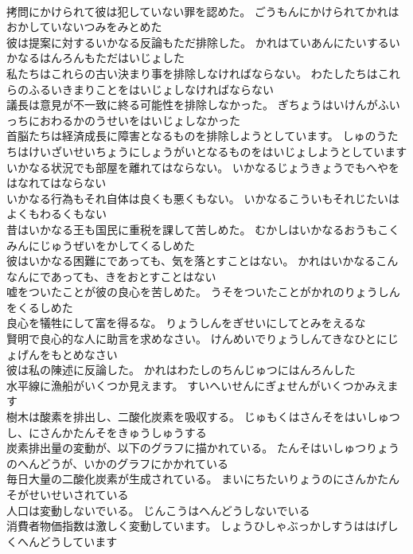 \documentclass[8pt]{extreport}
\begin{document}
\begin{CJK}{UTF8}{min}
\\	拷問にかけられて彼は犯していない罪を認めた。	ごうもんにかけられてかれはおかしていないつみをみとめた 
\\	彼は提案に対するいかなる反論もただ排除した。	かれはていあんにたいするいかなるはんろんもただはいじょした 
\\	私たちはこれらの古い決まり事を排除しなければならない。	わたしたちはこれらのふるいきまりことをはいじょしなければならない 
\\	議長は意見が不一致に終る可能性を排除しなかった。	ぎちょうはいけんがふいっちにおわるかのうせいをはいじょしなかった 
\\	首脳たちは経済成長に障害となるものを排除しようとしています。	しゅのうたちはけいざいせいちょうにしょうがいとなるものをはいじょしようとしています 
\\	いかなる状況でも部屋を離れてはならない。	いかなるじょうきょうでもへやをはなれてはならない 
\\	いかなる行為もそれ自体は良くも悪くもない。	いかなるこういもそれじたいはよくもわるくもない 
\\	昔はいかなる王も国民に重税を課して苦しめた。	むかしはいかなるおうもこくみんにじゅうぜいをかしてくるしめた 
\\	彼はいかなる困難にであっても、気を落とすことはない。	かれはいかなるこんなんにであっても、きをおとすことはない 
\\	嘘をついたことが彼の良心を苦しめた。	うそをついたことがかれのりょうしんをくるしめた 
\\	良心を犠牲にして富を得るな。	りょうしんをぎせいにしてとみをえるな 
\\	賢明で良心的な人に助言を求めなさい。	けんめいでりょうしんてきなひとにじょげんをもとめなさい 
\\	彼は私の陳述に反論した。	かれはわたしのちんじゅつにはんろんした 
\\	水平線に漁船がいくつか見えます。	すいへいせんにぎょせんがいくつかみえます 
\\	樹木は酸素を排出し、二酸化炭素を吸収する。	じゅもくはさんそをはいしゅつし、にさんかたんそをきゅうしゅうする 
\\	炭素排出量の変動が、以下のグラフに描かれている。	たんそはいしゅつりょうのへんどうが、いかのグラフにかかれている 
\\	毎日大量の二酸化炭素が生成されている。	まいにちたいりょうのにさんかたんそがせいせいされている 
\\	人口は変動しないでいる。	じんこうはへんどうしないでいる 
\\	消費者物価指数は激しく変動しています。	しょうひしゃぶっかしすうははげしくへんどうしています 

\end{CJK}
\end{document}
